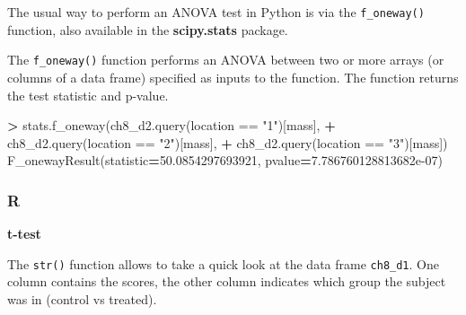 \documentclass[
]{book}
\newenvironment{Shaded}{\begin{snugshade}}{\end{snugshade}}
\newcommand{\DecValTok}[1]{\textcolor[rgb]{0.00,0.00,0.81}{#1}}
\newcommand{\ErrorTok}[1]{\textcolor[rgb]{0.64,0.00,0.00}{\textbf{#1}}}
\newcommand{\FloatTok}[1]{\textcolor[rgb]{0.00,0.00,0.81}{#1}}
\newcommand{\FunctionTok}[1]{\textcolor[rgb]{0.00,0.00,0.00}{#1}}
\newcommand{\NormalTok}[1]{#1}
\newcommand{\OperatorTok}[1]{\textcolor[rgb]{0.81,0.36,0.00}{\textbf{#1}}}
\newcommand{\SpecialCharTok}[1]{\textcolor[rgb]{0.00,0.00,0.00}{#1}}
\newcommand{\StringTok}[1]{\textcolor[rgb]{0.31,0.60,0.02}{#1}}
\begin{document}
The usual way to perform an ANOVA test in Python is via the \texttt{f\_oneway()} function, also available in the \textbf{scipy.stats} package.

The \texttt{f\_oneway()} function performs an ANOVA between two or more arrays (or columns of a data frame) specified as inputs to the function. The function returns the test statistic and p-value.

\begin{Shaded}
\begin{Highlighting}[]
\OperatorTok{\textgreater{}}\NormalTok{ stats.f\_oneway(ch8\_d2.query(}\StringTok{\textquotesingle{}location == "1"\textquotesingle{}}\NormalTok{)[}\StringTok{\textquotesingle{}mass\textquotesingle{}}\NormalTok{], }
\OperatorTok{+}\NormalTok{                ch8\_d2.query(}\StringTok{\textquotesingle{}location == "2"\textquotesingle{}}\NormalTok{)[}\StringTok{\textquotesingle{}mass\textquotesingle{}}\NormalTok{],}
\OperatorTok{+}\NormalTok{                ch8\_d2.query(}\StringTok{\textquotesingle{}location == "3"\textquotesingle{}}\NormalTok{)[}\StringTok{\textquotesingle{}mass\textquotesingle{}}\NormalTok{])}
\NormalTok{F\_onewayResult(statistic}\OperatorTok{=}\FloatTok{50.0854297693921}\NormalTok{, pvalue}\OperatorTok{=}\FloatTok{7.786760128813682e{-}07}\NormalTok{)}
\end{Highlighting}
\end{Shaded}

\hypertarget{r-45}{%
\subsubsection*{R}\label{r-45}}

\textbf{t-test}

The \texttt{str()} function allows to take a quick look at the data frame \texttt{ch8\_d1}. One column contains the scores, the other column indicates which group the subject was in (control vs treated).

\begin{Shaded}
\end{Shaded}
\end{document}
